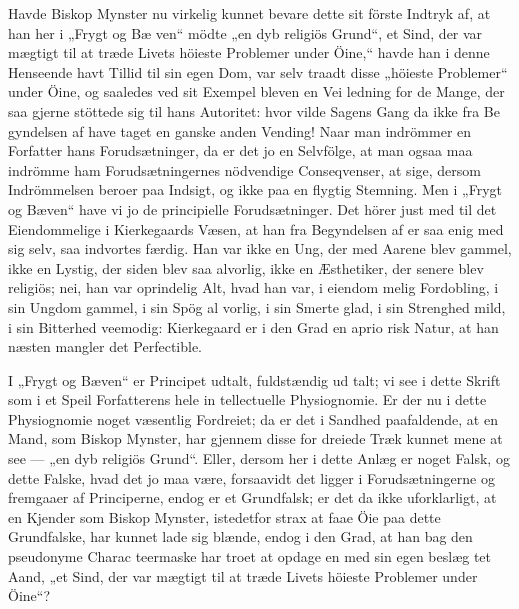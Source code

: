 \documentclass[12pt,a4paper]{article}
\newcommand{\opage}[1]{\marginnote{\footnotesize\textit{[#1]}}}
\begin{document}
Havde Biskop Mynster nu virkelig kunnet bevare
dette sit förste Indtryk af, at han her i „Frygt og Bæ\-%
ven“ mödte „en dyb religiös Grund“, et Sind, der var
mægtigt til at træde Livets höieste Problemer under
Öine,“ havde han i denne Henseende havt Tillid til sin
egen Dom, var selv traadt disse „höieste Problemer“
under Öine, og saaledes ved sit Exempel bleven en Vei\-%
ledning for de Mange, der saa gjerne stöttede sig til
hans Autoritet: hvor vilde Sagens Gang da ikke fra Be\-%
gyndelsen af have taget en ganske anden Vending!
Naar man indrömmer en Forfatter hans Forudsætninger,
da er det jo en Selvfölge, at man ogsaa maa indrömme
ham Forudsætningernes nödvendige Conseqvenser, at sige,
dersom Indrömmelsen beroer paa Indsigt, og ikke paa en
flygtig Stemning. Men i „Frygt og Bæven“ have vi jo
de principielle Forudsætninger. Det hörer just med til
det Eiendommelige i Kierkegaards Væsen, at han fra
Begyndelsen af er saa enig med sig selv, saa indvortes
færdig. Han var ikke en Ung, der med Aarene blev
gammel, ikke en Lystig, der siden blev saa alvorlig,
ikke en Æsthetiker, der senere blev religiös; nei,
han var oprindelig Alt, hvad han var, i eiendom\-%
melig Fordobling, i sin Ungdom gammel, i sin Spög al\-%
vorlig, i sin Smerte glad, i sin Strenghed mild, i sin
Bitterhed veemodig: Kierkegaard er i den Grad en aprio\-%
risk Natur, at han næsten mangler det Perfectible.

I „Frygt og Bæven“ er Principet udtalt, fuldstændig ud\-%
talt; vi see i dette Skrift som i et Speil Forfatterens hele in\-%
tellectuelle Physiognomie. Er der nu i dette Physiognomie
noget væsentlig Fordreiet; da er det i Sandhed paafaldende,
at en Mand, som Biskop Mynster, har gjennem disse for\-%
dreiede Træk kunnet mene at see --- „en dyb religiös
Grund“. Eller, dersom her i dette Anlæg er noget Falsk,
og dette Falske, hvad det jo maa være, forsaavidt det
\opage{8} %
ligger i Forudsætningerne og fremgaaer af Principerne,
endog er et Grundfalsk; er det da ikke uforklarligt, at
en Kjender som Biskop Mynster, istedetfor strax at faae
Öie paa dette Grundfalske, har kunnet lade sig blænde,
endog i den Grad, at han bag den pseudonyme Charac\-%
teermaske har troet at opdage en med sin egen beslæg\-%
tet Aand, „et Sind, der var mægtigt til at træde Livets
höieste Problemer under Öine“?
\end{document}
